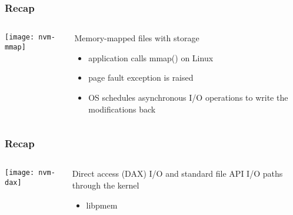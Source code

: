 \begin{frame}[plain]
	\frametitle{Recap}
	
	
	
	\begin{columns}
		
		\begin{column}{.5\textwidth}
			
			\texttt{[image: nvm-mmap]}
			
		\end{column}
		
		\begin{column}{.5\textwidth}
			
	
			Memory-mapped files with storage
			\begin{itemize}

					\item application calls mmap() on Linux
                    \item page fault exception is raised 
                    \item OS schedules asynchronous I/O operations to write the modifications back 

			\end{itemize}	
			
	
		\end{column}
		
		
	\end{columns}
	
	
\end{frame}

\begin{frame}[plain]
	\frametitle{Recap}
	
	
	
	\begin{columns}
		
		\begin{column}{.5\textwidth}
			
			\texttt{[image: nvm-dax]}
			
		\end{column}
		
		\begin{column}{.5\textwidth}
			
			\Large
			Direct access (DAX) I/O and standard file API I/O paths through the kernel	
			\begin{itemize}
                \item libpmem 
			\end{itemize}	
			
		
		\end{column}
		
		
	\end{columns}
	
	
\end{frame}




